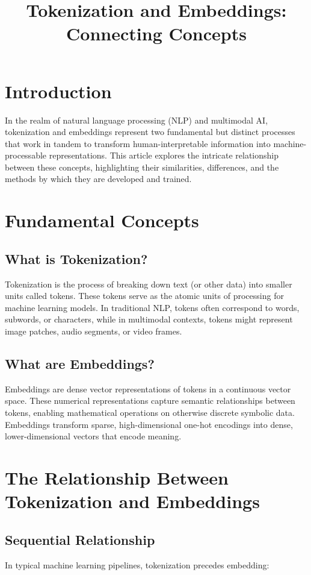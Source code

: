 \documentclass{article}
\title{Tokenization and Embeddings: Connecting Concepts}
\author{}
\date{}
\begin{document}
\maketitle

\section{Introduction}
In the realm of natural language processing (NLP) and multimodal AI, tokenization and embeddings represent two fundamental but distinct processes that work in tandem to transform human-interpretable information into machine-processable representations. This article explores the intricate relationship between these concepts, highlighting their similarities, differences, and the methods by which they are developed and trained.

\section{Fundamental Concepts}
\subsection{What is Tokenization?}
Tokenization is the process of breaking down text (or other data) into smaller units called tokens. These tokens serve as the atomic units of processing for machine learning models. In traditional NLP, tokens often correspond to words, subwords, or characters, while in multimodal contexts, tokens might represent image patches, audio segments, or video frames.

\subsection{What are Embeddings?}
Embeddings are dense vector representations of tokens in a continuous vector space. These numerical representations capture semantic relationships between tokens, enabling mathematical operations on otherwise discrete symbolic data. Embeddings transform sparse, high-dimensional one-hot encodings into dense, lower-dimensional vectors that encode meaning.

\section{The Relationship Between Tokenization and Embeddings}
\subsection{Sequential Relationship}
In typical machine learning pipelines, tokenization precedes embedding:
\end{document}
